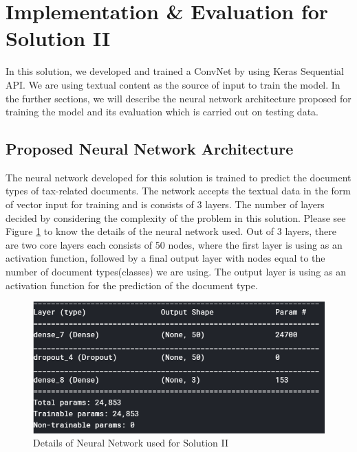 \section{Implementation \& Evaluation for Solution II}
In this solution, we developed and trained a ConvNet by using Keras Sequential API. We are using textual content as the source of input to train the model. In the further sections, we will describe the neural network architecture proposed for training the model and its evaluation which is carried out on testing data.
\subsection{Proposed Neural Network Architecture}
The neural network developed for this solution is trained to predict the document types of tax-related documents. The network accepts the textual data in the form of vector input for training and is consists of 3 layers. The number of layers decided by considering the complexity of the problem in this solution. Please see Figure \ref{sol2_network_details} to know the details of the neural network used. Out of 3 layers, there are two core layers each consists of 50 nodes, where the first layer is using  as an activation function, followed by a final output layer with nodes equal to the number of document types(classes) we are using. The output layer is using  as an activation function for the prediction of the document type.
\begin{figure}[H]
\centering
\includegraphics[scale=0.7]{images/Chapter5/sol_2/network_detail_sol2.png}
\caption{Details of Neural Network used for Solution II}
\label{sol2_network_details}
\end{figure}
\par
